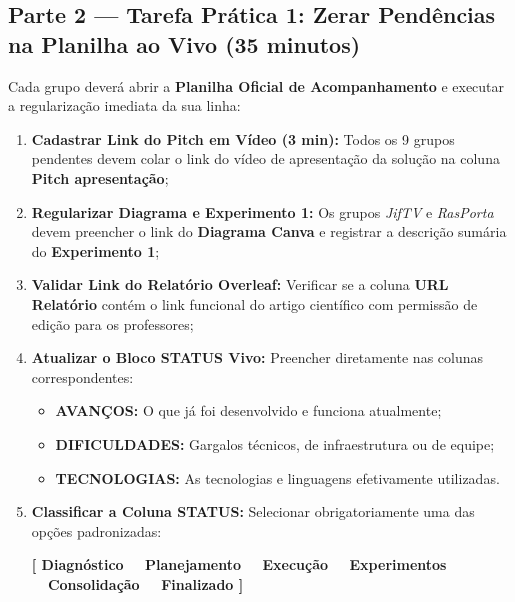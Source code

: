 \subsection{Parte 2 — Tarefa Prática 1: Zerar Pendências na Planilha ao Vivo (35 minutos)}

\begin{boxAtividade}

Cada grupo deverá abrir a \textbf{Planilha Oficial de Acompanhamento} e executar a regularização imediata da sua linha:

\begin{enumerate}
\item \textbf{Cadastrar Link do Pitch em Vídeo (3 min):} Todos os 9 grupos pendentes devem colar o link do vídeo de apresentação da solução na coluna \textbf{Pitch apresentação};
\item \textbf{Regularizar Diagrama e Experimento 1:} Os grupos \textit{JifTV} e \textit{RasPorta} devem preencher o link do \textbf{Diagrama Canva} e registrar a descrição sumária do \textbf{Experimento 1};
\item \textbf{Validar Link do Relatório Overleaf:} Verificar se a coluna \textbf{URL Relatório} contém o link funcional do artigo científico com permissão de edição para os professores;
\item \textbf{Atualizar o Bloco STATUS Vivo:} Preencher diretamente nas colunas correspondentes:
  \begin{itemize}
      \item \textbf{AVANÇOS:} O que já foi desenvolvido e funciona atualmente;
      \item \textbf{DIFICULDADES:} Gargalos técnicos, de infraestrutura ou de equipe;
      \item \textbf{TECNOLOGIAS:} As tecnologias e linguagens efetivamente utilizadas.
  \end{itemize}
\item \textbf{Classificar a Coluna STATUS:} Selecionar obrigatoriamente uma das opções padronizadas:
\begin{center}
\textbf{\small [ Diagnóstico \ \textbar \ Planejamento \ \textbar \ Execução \ \textbar \ Experimentos \ \textbar \ Consolidação \ \textbar \ Finalizado ]}
\end{center}
\end{enumerate}

\end{boxAtividade}


